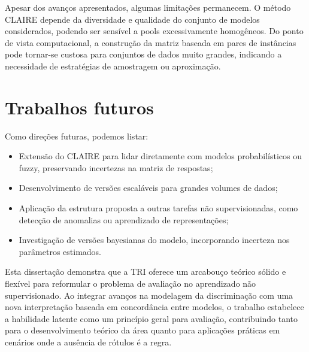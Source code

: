 Apesar dos avanços apresentados, algumas limitações permanecem. O método \gls{CLAIRE} depende da diversidade e qualidade do conjunto de modelos considerados, podendo ser sensível a pools excessivamente homogêneos. Do ponto de vista computacional, a construção da matriz baseada em pares de instâncias pode tornar-se custosa para conjuntos de dados muito grandes, indicando a necessidade de estratégias de amostragem ou aproximação.

\section{Trabalhos futuros}

Como direções futuras, podemos listar:

\begin{itemize}
    \item[i] Extensão do \gls{CLAIRE} para lidar diretamente com modelos probabilísticos ou fuzzy, preservando incertezas na matriz de respostas;
    \item[ii] Desenvolvimento de versões escaláveis para grandes volumes de dados;
    \item[iii] Aplicação da estrutura proposta a outras tarefas não supervisionadas, como detecção de anomalias ou aprendizado de representações;
    \item[iv] Investigação de versões bayesianas do modelo, incorporando incerteza nos parâmetros estimados.
\end{itemize}

Esta dissertação demonstra que a \gls{TRI} oferece um arcabouço teórico sólido e flexível para reformular o problema de avaliação no aprendizado não supervisionado. Ao integrar avanços na modelagem da discriminação com uma nova interpretação baseada em concordância entre modelos, o trabalho estabelece a habilidade latente como um princípio geral para avaliação, contribuindo tanto para o desenvolvimento teórico da área quanto para aplicações práticas em cenários onde a ausência de rótulos é a regra.